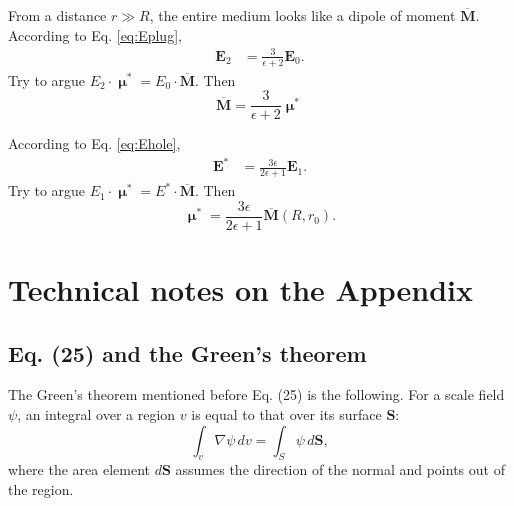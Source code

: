 \documentclass[11pt]{article}
\newcommand{\vct}[1]{\boldsymbol{\mathbf{#1}}}
\newcommand{\vE}{\vct{E}}
\newcommand{\vMbar}{\overline{\vct{M}}}
\newcommand{\vmu}{\vct{\upmu}}
\begin{document}
From a distance $r \gg R$,
the entire medium looks like a dipole of moment $\vMbar$.
%
According to Eq. \eqref{eq:Eplug},
\begin{align*}
  \vE_2
&=
  \frac{ 3 } { \epsilon + 2 } \vE_0.
\end{align*}
%
Try to argue
$E_2 \cdot \vmu^* = E_0 \cdot \vMbar$.
Then
\begin{equation}
  \vMbar
=
  \frac{ 3 } { \epsilon + 2 } \vmu^*
\end{equation}

According to Eq. \eqref{eq:Ehole},
\begin{align*}
  \vE^*
&=
  \frac{ 3 \epsilon } { 2 \epsilon + 1 } \vE_1.
\end{align*}
Try to argue
$E_1 \cdot \vmu^* = E^* \cdot \vMbar$.
Then
\begin{equation}
  \vmu^*
=
  \frac{ 3 \epsilon } { 2 \epsilon + 1}
  \vMbar(R, r_0).
\end{equation}



\section{Technical notes on the Appendix}



\begin{center}
\end{center}



\subsection{Eq. (25) and the Green's theorem}



The Green's theorem mentioned before Eq. (25) is the following.
%
For a scale field $\psi$,
an integral over a region $v$
is equal to that over its surface $\vct S$:
\begin{equation}
  \int_v \nabla \psi \, d v
=
  \int_S \psi \, d\vct S,
  \label{eq:green}
\end{equation}
%
where the area element $d\vct S$
assumes the direction of the normal
and points out of the region.
\end{document}
